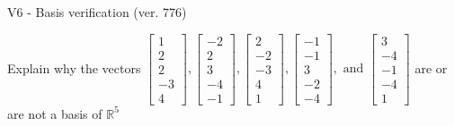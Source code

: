 \begin{exercise}
  \begin{exerciseTitle}V6 - Basis verification (ver. 776)\end{exerciseTitle}
  \begin{exerciseStatement}
    Explain why the vectors \(\left[\begin{array}{r}
1 \\
2 \\
2 \\
-3 \\
4
\end{array}\right] , \left[\begin{array}{r}
-2 \\
2 \\
3 \\
-4 \\
-1
\end{array}\right] , \left[\begin{array}{r}
2 \\
-2 \\
-3 \\
4 \\
1
\end{array}\right] , \left[\begin{array}{r}
-1 \\
-1 \\
3 \\
-2 \\
-4
\end{array}\right] , \text{ and } \left[\begin{array}{r}
3 \\
-4 \\
-1 \\
-4 \\
1
\end{array}\right]\) are or are not a basis of \(\mathbb{R}^5\)	



\end{exerciseStatement}
\end{exercise}
